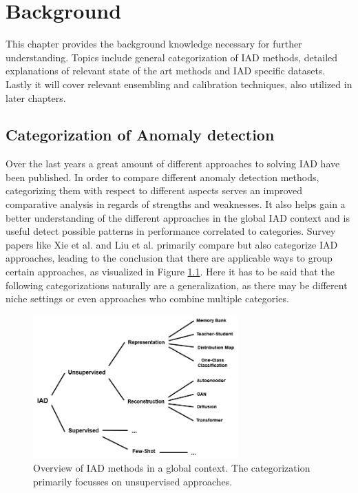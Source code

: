 \chapter{Background}
\label{chap:background}

This chapter provides the background knowledge necessary for further understanding. Topics include general categorization of IAD methods, detailed explanations of relevant 
state of the art methods and IAD specific datasets. Lastly it will cover relevant ensembling and calibration techniques, also utilized in later chapters.

\section{Categorization of Anomaly detection}
\label{sec:IADcategs}
Over the last years a great amount of different approaches to solving IAD have been published. In order to compare different anomaly detection methods, categorizing them with respect to different 
aspects serves an improved comparative analysis in regards of strengths and weaknesses. It also helps gain a better understanding of the different approaches in the global IAD context and
is useful detect possible patterns in performance correlated to categories. Survey papers like Xie et al. \cite{Xie_2024benchmarking} and 
Liu et al.
\cite{liu2024deep} primarily compare but also categorize IAD approaches, leading to the conclusion that there are applicable ways to group certain approaches, as 
visualized in Figure \ref{fig:IADcategstree}. Here it has to be said that the following categorizations naturally are a generalization, as there may be different niche settings or even approaches who combine multiple categories.

\begin{figure}[ht]
    \centering
    \includegraphics[width=0.7\textwidth]{figures/baumtree.drawio.png}
    \caption{Overview of IAD methods in a global context. The categorization primarily focusses on unsupervised approaches.}
    \label{fig:IADcategstree}
\end{figure}

